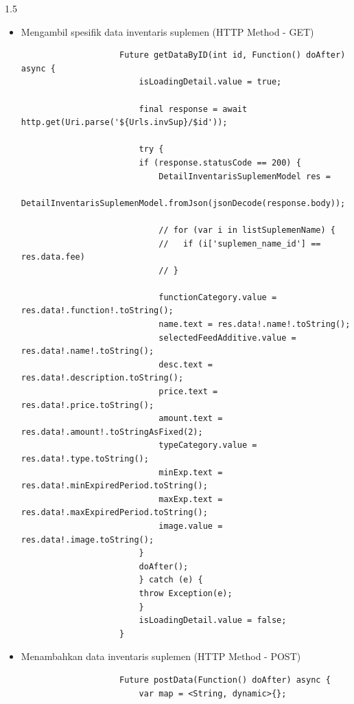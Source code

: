\begin{spacing}{1.5}
\begin{enumerate}
\begin{enumerate}
\begin{itemize}
\begin{lstlisting}
								selectedCultureProbiotik.value = listCultureProbiotik[0];
								}
								if (type == 'Feed Additive') {
								listCarbon.add({
									'id': i.idInt,
									'suplemen_id': i.sId,
									'suplemen_name': i.name,
								});

								selectedCarbon.value = listCarbon[0];
								}
							}
							}

							// inspect(listCultureProbiotik);

							doAfter();
						}
						} catch (e) {
						inspect(e);
						throw Exception(e);
						}
						isProbLoading.value = false;
						isCarbLoading.value = false;
						isLoadingPage.value = false;
					}
				\end{lstlisting}

				\item Mengambil spesifik data inventaris suplemen (HTTP Method - GET)
				
				\begin{lstlisting}
					Future getDataByID(int id, Function() doAfter) async {
						isLoadingDetail.value = true;

						final response = await http.get(Uri.parse('${Urls.invSup}/$id'));

						try {
						if (response.statusCode == 200) {
							DetailInventarisSuplemenModel res =
								DetailInventarisSuplemenModel.fromJson(jsonDecode(response.body));

							// for (var i in listSuplemenName) {
							//   if (i['suplemen_name_id'] == res.data.fee)
							// }

							functionCategory.value = res.data!.function!.toString();
							name.text = res.data!.name!.toString();
							selectedFeedAdditive.value = res.data!.name!.toString();
							desc.text = res.data!.description.toString();
							price.text = res.data!.price.toString();
							amount.text = res.data!.amount!.toStringAsFixed(2);
							typeCategory.value = res.data!.type.toString();
							minExp.text = res.data!.minExpiredPeriod.toString();
							maxExp.text = res.data!.maxExpiredPeriod.toString();
							image.value = res.data!.image.toString();
						}
						doAfter();
						} catch (e) {
						throw Exception(e);
						}
						isLoadingDetail.value = false;
					}
				\end{lstlisting}

				\item Menambahkan data inventaris suplemen (HTTP Method - POST)
				
				\begin{lstlisting}
					Future postData(Function() doAfter) async {
						var map = <String, dynamic>{};


\end{lstlisting}
\end{itemize}
\end{enumerate}
\end{enumerate}
\end{spacing}
